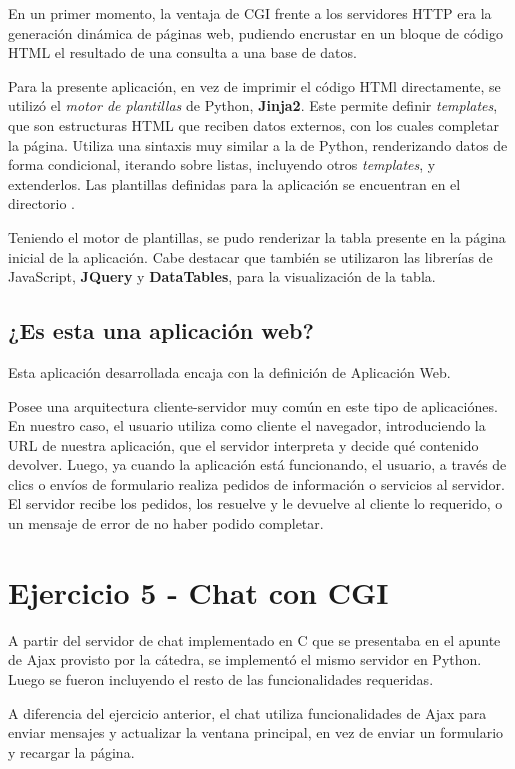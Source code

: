 En un primer momento, la ventaja de CGI frente a los servidores HTTP era la generación dinámica de páginas web, pudiendo encrustar en un bloque de código HTML el resultado de una consulta a una base de datos.

Para la presente aplicación, en vez de imprimir el código HTMl directamente, se utilizó el \emph{motor de plantillas} de Python, \textbf{Jinja2}. Este permite definir \emph{templates}, que son estructuras HTML que reciben datos externos, con los cuales completar la página. Utiliza una sintaxis muy similar a la de Python, renderizando datos de forma condicional, iterando sobre listas, incluyendo otros \emph{templates}, y extenderlos. Las plantillas definidas para la aplicación se encuentran en el directorio .

Teniendo el motor de plantillas, se pudo renderizar la tabla presente en la página inicial de la aplicación. Cabe destacar que también se utilizaron las librerías de JavaScript, \textbf{JQuery} y \textbf{DataTables}, para la visualización de la tabla.  

\subsection{¿Es esta una aplicación web?}

Esta aplicación desarrollada encaja con la definición de Aplicación Web.

Posee una arquitectura cliente-servidor muy común en este tipo de aplicaciónes. En nuestro caso, el usuario utiliza como cliente el navegador, introduciendo la URL de nuestra aplicación, que el servidor interpreta y decide qué contenido devolver. Luego, ya cuando la aplicación está funcionando, el usuario, a través de clics o envíos de formulario realiza pedidos de información o servicios al servidor. El servidor recibe los pedidos, los resuelve y le devuelve al cliente lo requerido, o un mensaje de error de no haber podido completar.


\section{Ejercicio 5 - Chat con CGI}

A partir del servidor de chat implementado en C que se presentaba en el apunte de Ajax provisto por la cátedra, se implementó el mismo servidor en Python. Luego se fueron incluyendo el resto de las funcionalidades requeridas.

A diferencia del ejercicio anterior, el chat utiliza funcionalidades de Ajax para enviar mensajes y actualizar la ventana principal, en vez de enviar un formulario y recargar la página.

